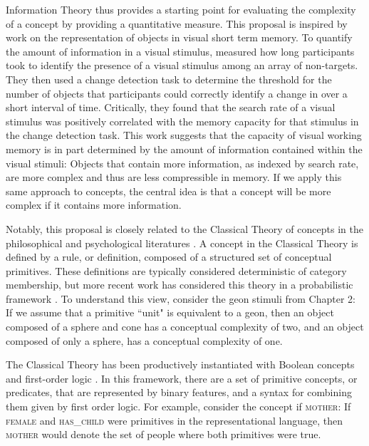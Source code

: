 Information Theory thus provides a  starting point for evaluating the complexity of a concept by providing a quantitative measure. This proposal is inspired by work on the representation of objects in visual short term memory. To quantify the amount of information in a visual stimulus,  measured how long participants took to identify the presence of a visual stimulus among an array of  non-targets. They then used a change detection task to determine the threshold for the number of objects that participants could correctly identify a change in over a short interval of time. Critically, they found that the search rate of a visual stimulus was positively correlated with the memory capacity for that stimulus in the change detection task.  This work suggests that the capacity of visual working memory is in part determined by the amount of information contained within the visual stimuli: Objects that contain more information, as indexed by search rate, are more complex and thus are less compressible in memory. If we apply this same approach to concepts, the central idea is that a concept will be more complex if it contains more information. 


Notably, this proposal is closely related to the Classical Theory of concepts in the philosophical and psychological literatures  \cite{laurence1999concepts}.  A concept in the Classical Theory is defined by a rule, or definition, composed of a structured set of conceptual primitives. These definitions are typically considered deterministic of category membership, but more recent work has considered this theory in a probabilistic framework \cite{goodman2008rational}. To understand this view, consider the geon stimuli from Chapter 2:  If we assume that a primitive ``unit" is equivalent to a geon,  then an object composed of a sphere and cone has a conceptual complexity of two, and an object composed of only a sphere, has a conceptual complexity of one. 

The Classical Theory has been productively instantiated with Boolean concepts and first-order logic \cite{shepard1961learning,feldman2000minimization,goodman2008rational}.  In this  framework, there are a set of primitive concepts, or predicates, that are represented by binary features, and a syntax for combining them given by first order logic.  For example, consider the concept if \textsc{mother}: If \textsc{female} and \textsc{has\_child} were primitives in the representational language, then  \textsc{mother} would denote the set of people where both primitives were true. 

